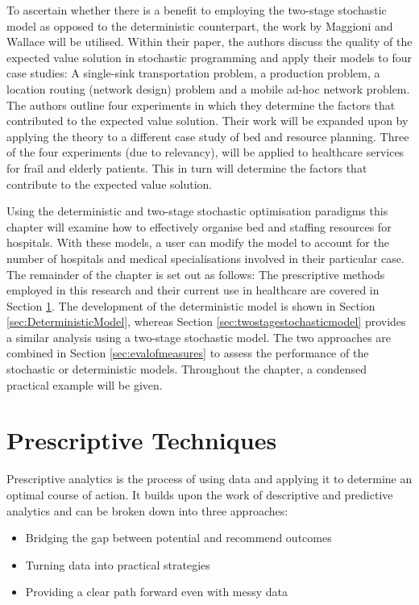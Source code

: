 \documentclass[../thesis.tex]{subfiles}
\begin{document}
To ascertain whether there is a benefit to employing the two-stage stochastic model as opposed to the deterministic counterpart, the work by Maggioni and Wallace \cite{Maggioni2010} will be utilised. Within their paper, the authors discuss the quality of the expected value solution in stochastic programming and apply their models to four case studies: A single-sink transportation problem, a production problem, a location routing (network design) problem and a mobile ad-hoc network problem. The authors outline four experiments in which they determine the factors that contributed to the expected value solution. Their work will be expanded upon by applying the theory to a different case study of bed and resource planning. Three of the four experiments (due to relevancy), will be applied to healthcare services for frail and elderly patients. This in turn will determine the factors that contribute to the expected value solution. 

Using the deterministic and two-stage stochastic optimisation paradigms this chapter will examine how to effectively organise bed and staffing resources for hospitals. With these models, a user can modify the model to account for the number of hospitals and medical specialisations involved in their particular case. The remainder of the chapter is set out as follows:  The prescriptive methods employed in this research and their current use in healthcare are covered in Section \ref{sec:prescriptive}. The development of the deterministic model is shown in Section \ref{sec:DeterministicModel}, whereas Section \ref{sec:twostagestochasticmodel} provides a similar analysis using a two-stage stochastic model. The two approaches are combined in Section \ref{sec:evalofmeasures} to assess the performance of the stochastic or deterministic models. Throughout the chapter, a condensed practical example will be given.

\section{Prescriptive Techniques} \label{sec:prescriptive}

Prescriptive analytics is the process of using data and applying it to determine an optimal course of action. It builds upon the work of descriptive and predictive analytics and can be broken down into three approaches:
\begin{itemize}
    \item Bridging the gap between potential and recommend outcomes
    \item Turning data into practical strategies
    \item Providing a clear path forward even with messy data
\end{itemize}
\end{document}
